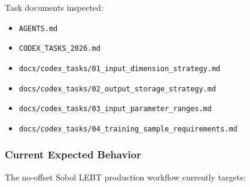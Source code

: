 \documentclass[
]{article}
\providecommand{\tightlist}{%
  \setlength{\itemsep}{0pt}\setlength{\parskip}{0pt}}
\begin{document}
Task documents inspected:

\begin{itemize}
\tightlist
\item
  \texttt{AGENTS.md}
\item
  \texttt{CODEX\_TASKS\_2026.md}
\item
  \texttt{docs/codex\_tasks/01\_input\_dimension\_strategy.md}
\item
  \texttt{docs/codex\_tasks/02\_output\_storage\_strategy.md}
\item
  \texttt{docs/codex\_tasks/03\_input\_parameter\_ranges.md}
\item
  \texttt{docs/codex\_tasks/04\_training\_sample\_requirements.md}
\end{itemize}

\hypertarget{current-expected-behavior}{%
\subsubsection{Current Expected
Behavior}\label{current-expected-behavior}}

The no-offset Sobol LEBT production workflow currently targets:
\end{document}
